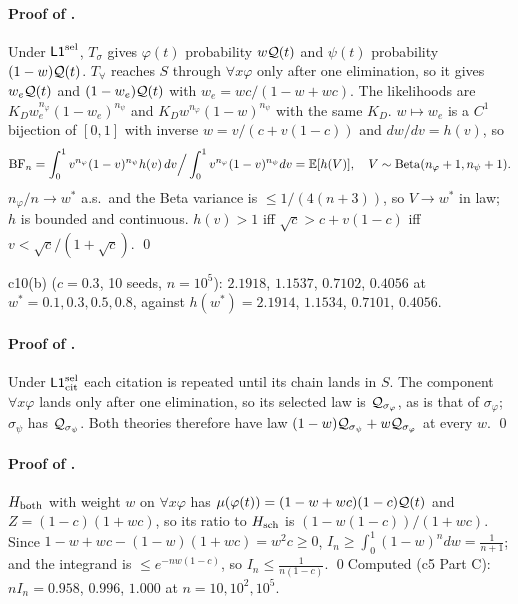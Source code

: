 \paragraph{Proof of .} Under $\mathord{\mathsf{L1}}^{\mathrm{sel}}$, $T_\sigma$ gives $\varphi(t)$ probability $w\mathcal{Q}(t)$ and $\psi(t)$ probability $(1-w)\mathcal{Q}(t)$. $T_\forall$ reaches $S$ through $\forall x\varphi$ only after one elimination, so it gives $w_e\mathcal{Q}(t)$ and $(1-w_e)\mathcal{Q}(t)$ with $w_e=wc/(1-w+wc)$. The likelihoods are $K_Dw_e^{n_\varphi}(1-w_e)^{n_\psi}$ and $K_Dw^{n_\varphi}(1-w)^{n_\psi}$ with the same $K_D$. $w\mapsto w_e$ is a $C^1$ bijection of $[0,1]$ with inverse $w=v/(c+v(1-c))$ and $dw/dv=h(v)$, so
\[\mathrm{BF}_n=\int_0^1v^{n_\varphi}(1-v)^{n_\psi}h(v)\,dv\Big/\int_0^1v^{n_\varphi}(1-v)^{n_\psi}dv=\mathbb{E}[h(V)],\quad V\sim\mathrm{Beta}(n_\varphi+1,n_\psi+1).\]
$n_\varphi/n\to w^*$ a.s.\ and the Beta variance is $\le1/(4(n+3))$, so $V\to w^*$ in law; $h$ is bounded and continuous. $h(v)>1$ iff $\sqrt c>c+v(1-c)$ iff $v<\sqrt c/(1+\sqrt c)$. \qed

c10(b) ($c=0.3$, 10 seeds, $n=10^5$): $2.1918$, $1.1537$, $0.7102$, $0.4056$ at $w^*=0.1,0.3,0.5,0.8$, against $h(w^*)=2.1914$, $1.1534$, $0.7101$, $0.4056$.

\paragraph{Proof of .} Under $\mathord{\mathsf{L1}}^{\mathrm{sel}}_{\mathrm{cit}}$ each citation is repeated until its chain lands in $S$. The component $\forall x\varphi$ lands only after one elimination, so its selected law is $\mathcal{Q}_{\sigma_\varphi}$, as is that of $\sigma_\varphi$; $\sigma_\psi$ has $\mathcal{Q}_{\sigma_\psi}$. Both theories therefore have law $(1-w)\mathcal{Q}_{\sigma_\psi}+w\mathcal{Q}_{\sigma_\varphi}$ at every $w$. \qed

\paragraph{Proof of .} $H_{\mathrm{both}}$ with weight $w$ on $\forall x\varphi$ has $\mu(\varphi(t))=(1-w+wc)(1-c)\mathcal{Q}(t)$ and $Z=(1-c)(1+wc)$, so its ratio to $H_{\mathrm{sch}}$ is $(1-w(1-c))/(1+wc)$. Since $1-w+wc-(1-w)(1+wc)=w^2c\ge0$, $I_n\ge\int_0^1(1-w)^ndw=\frac1{n+1}$; and the integrand is $\le e^{-nw(1-c)}$, so $I_n\le\frac1{n(1-c)}$. \qed Computed (c5 Part C): $nI_n=0.958$, $0.996$, $1.000$ at $n=10,10^2,10^5$.

